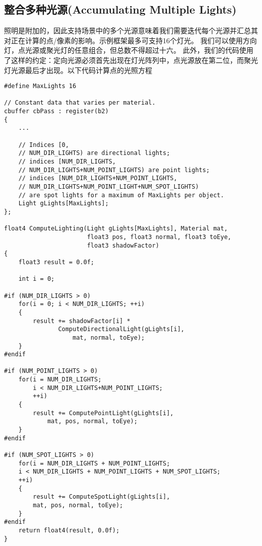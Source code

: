 \subsection{整合多种光源(Accumulating Multiple Lights)}
\begin{flushleft}
照明是附加的，因此支持场景中的多个光源意味着我们需要迭代每个光源并汇总其对正在计算的点/像素的影响。示例框架最多可支持16个灯光。 我们可以使用方向灯，点光源或聚光灯的任意组合，但总数不得超过十六。 此外，我们的代码使用了这样的约定：定向光源必须首先出现在灯光阵列中，点光源放在第二位，而聚光灯光源最后才出现。以下代码计算点的光照方程\\
\end{flushleft}

\begin{lstlisting}
#define MaxLights 16

// Constant data that varies per material.
cbuffer cbPass : register(b2)
{
    ...

    // Indices [0, 
    // NUM_DIR_LIGHTS) are directional lights;
    // indices [NUM_DIR_LIGHTS, 
    // NUM_DIR_LIGHTS+NUM_POINT_LIGHTS) are point lights;
    // indices [NUM_DIR_LIGHTS+NUM_POINT_LIGHTS, 
    // NUM_DIR_LIGHTS+NUM_POINT_LIGHT+NUM_SPOT_LIGHTS)
    // are spot lights for a maximum of MaxLights per object.
    Light gLights[MaxLights];
};

float4 ComputeLighting(Light gLights[MaxLights], Material mat,
                       float3 pos, float3 normal, float3 toEye,
                       float3 shadowFactor)
{
    float3 result = 0.0f;

    int i = 0;

#if (NUM_DIR_LIGHTS > 0)
    for(i = 0; i < NUM_DIR_LIGHTS; ++i)
    {
        result += shadowFactor[i] * 
               ComputeDirectionalLight(gLights[i], 
                   mat, normal, toEye);
    }
#endif

#if (NUM_POINT_LIGHTS > 0)
    for(i = NUM_DIR_LIGHTS; 
        i < NUM_DIR_LIGHTS+NUM_POINT_LIGHTS;
        ++i)
    {
        result += ComputePointLight(gLights[i], 
            mat, pos, normal, toEye);
    }
#endif

#if (NUM_SPOT_LIGHTS > 0)
    for(i = NUM_DIR_LIGHTS + NUM_POINT_LIGHTS; 
    i < NUM_DIR_LIGHTS + NUM_POINT_LIGHTS + NUM_SPOT_LIGHTS;
    ++i)
    {
        result += ComputeSpotLight(gLights[i], 
        mat, pos, normal, toEye);
    }
#endif 
    return float4(result, 0.0f);
}
\end{lstlisting}

